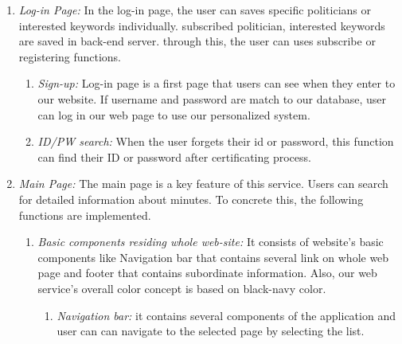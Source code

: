 \documentclass[conference]{IEEEtran}
\begin{document}
\begin{enumerate}
    \item \textit {Log-in Page:}
In the log-in page, the user can saves specific politicians or interested keywords individually. subscribed politician, interested keywords are saved in back-end server. through this, the user can uses subscribe or registering functions.\\
    \begin{enumerate}
        \item \textit {Sign-up:}  Log-in page is a first page that users can see when they enter to our website. If username and password are match to our database, user can log in our web page to use our personalized system.\\
        \item \textit {ID/PW search:} When the user forgets their id or password, this function can find their ID or password after  certificating process.\\
    \end{enumerate}
   
    \item \textit {Main Page:}  The main page is a key feature of this service. Users can search for detailed information about minutes. To concrete this, the following functions are implemented. \\
   
      \begin{enumerate}
    \item \textit{Basic components residing whole web-site:} It consists of website's basic components like Navigation bar that contains several link on whole web page and footer that contains subordinate information. Also, our web service's overall color concept is based on black-navy color. \\
            \begin{enumerate}
    \item \textit{Navigation bar:} it contains several components of the application and user can can navigate to the selected page by selecting the list. \\
   

\end{enumerate}
\end{enumerate}
\end{enumerate}
\end{document}
